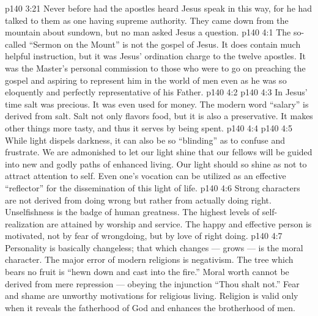 \vs p140 3:21 \pc Never before had the apostles heard Jesus speak in this way, for he had talked to them as one having supreme authority. They came down from the mountain about sundown, but no man asked Jesus a question.
\vs p140 4:1 The so\hyp{}called “Sermon on the Mount” is not the gospel of Jesus. It does contain much helpful instruction, but it was Jesus’ ordination charge to the twelve apostles. It was the Master’s personal commission to those who were to go on preaching the gospel and aspiring to represent him in the world of men even as he was so eloquently and perfectly representative of his Father.
\vs p140 4:2 \pc {}
\vs p140 4:3 In Jesus’ time salt was precious. It was even used for money. The modern word “salary” is derived from salt. Salt not only flavors food, but it is also a preservative. It makes other things more tasty, and thus it serves by being spent.
\vs p140 4:4 \pc {}
\vs p140 4:5 While light dispels darkness, it can also be so “blinding” as to confuse and frustrate. We are admonished to let our light  shine that our fellows will be guided into new and godly paths of enhanced living. Our light should so shine as not to attract attention to self. Even one’s vocation can be utilized as an effective “reflector” for the dissemination of this light of life.
\vs p140 4:6 Strong characters are not derived from  doing wrong but rather from actually doing right. Unselfishness is the badge of human greatness. The highest levels of self\hyp{}realization are attained by worship and service. The happy and effective person is motivated, not by fear of wrongdoing, but by love of right doing.
\vs p140 4:7 \pc {} Personality is basically changeless; that which changes --- grows --- is the moral character. The major error of modern religions is negativism. The tree which bears no fruit is \textcolor{ubdarkred}{“hewn down and cast into the fire.”} Moral worth cannot be derived from mere repression --- obeying the injunction “Thou shalt not.” Fear and shame are unworthy motivations for religious living. Religion is valid only when it reveals the fatherhood of God and enhances the brotherhood of men.
